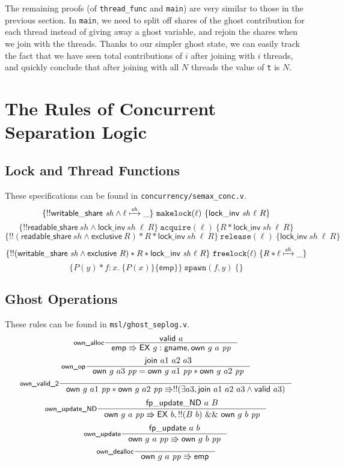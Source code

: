 \documentclass[11pt]{article} %
\begin{document}
The remaining proofs (of \texttt{thread\_func} and \texttt{main}) are very similar to those in the previous section. In \texttt{main}, we need to split off shares of the ghost contribution for each thread instead of giving away a ghost variable, and rejoin the shares when we join with the threads. Thanks to our simpler ghost state, we can easily track the fact that we have seen total contributions of $i$ after joining with $i$ threads, and quickly conclude that after joining with all $N$ threads the value of \texttt{t} is $N$.

\section{The Rules of Concurrent Separation Logic}
\label{CSL}
\subsection{Lock and Thread Functions}
These specifications can be found in \texttt{concurrency/semax\_conc.v}.
$$\{!!\mathsf{writable\_share}\ \mathit{sh} \land \ell \xmapsto{\mathit{sh}} \_\}\ \texttt{makelock}(\ell)\ \{\mathsf{lock\_inv}\ \mathit{sh}\ \ell\ R\}$$
$$\{!!\mathsf{readable\_share}\ \mathit{sh} \land \mathsf{lock\_inv}\ \mathit{sh}\ \ell\ R\}\ \texttt{acquire}(\ell)\ \{R * \mathsf{lock\_inv}\ \mathit{sh}\ \ell\ R\}$$
$$\{!!(\mathsf{readable\_share}\ \mathit{sh} \land \mathsf{exclusive}\ R) * R * \mathsf{lock\_inv}\ \mathit{sh}\ \ell\ R\}\ \texttt{release}(\ell)\ \{\mathsf{lock\_inv}\ \mathit{sh}\ \ell\ R\}$$
$$\{!!(\mathsf{writable\_share}\ \mathit{sh} \land \mathsf{exclusive}\ R) * R * \mathsf{lock\_inv}\ \mathit{sh}\ \ell\ R\}\ \texttt{freelock}(\ell)\ \{R * \ell \xmapsto{\mathit{sh}} \_\}$$
$$\{P(y) * f : x.\ \{P(x)\}\{\mathsf{emp}\}\}\ \texttt{spawn}(f, y)\ \{\}$$

\subsection{Ghost Operations}
These rules can be found in \texttt{msl/ghost\_seplog.v}.
$$\inference[\textsf{own\_alloc}]{\mathsf{valid}\ a}{\mathsf{emp} \Rrightarrow \mathsf{EX}\ g : \mathsf{gname}, \mathsf{own}\ g\ a\ \mathit{pp}}$$
$$\inference[\textsf{own\_op}]{\mathsf{join}\ a1\ a2\ a3}{\mathsf{own}\ g\ a3\ \mathit{pp} = \mathsf{own}\ g\ a1\ \mathit{pp} * \mathsf{own}\ g\ a2\ \mathit{pp}}$$
$$\inference[\textsf{own\_valid\_2}]{}{\mathsf{own}\ g\ a1\ \mathit{pp} * \mathsf{own}\ g\ a2\ \mathit{pp} \Rrightarrow !!(\exists a3, \mathsf{join}\ a1\ a2\ a3 \land \mathsf{valid}\ a3)}$$
$$\inference[\textsf{own\_update\_ND}]{\mathsf{fp\_update\_ND}\ a\ B}{\mathsf{own}\ g\ a\ \mathit{pp} \Rrightarrow \mathsf{EX}\ b, !!(B\ b)\ \&\&\ \mathsf{own}\ g\ b\ \mathit{pp}}$$
$$\inference[\textsf{own\_update}]{\mathsf{fp\_update}\ a\ b}{\mathsf{own}\ g\ a\ \mathit{pp} \Rrightarrow \mathsf{own}\ g\ b\ \mathit{pp}}$$
$$\inference[\textsf{own\_dealloc}]{}{\mathsf{own}\ g\ a\ \mathit{pp} \Rrightarrow \mathsf{emp}}$$
\end{document}
